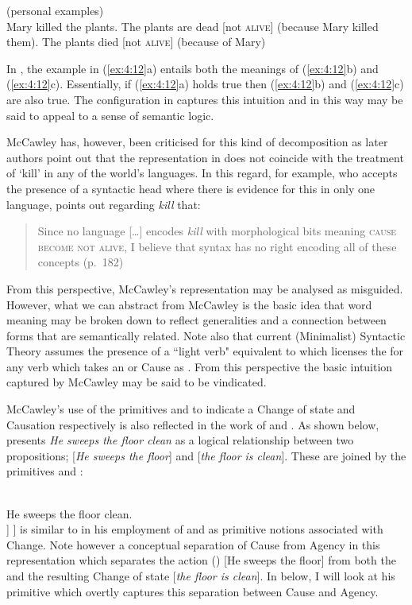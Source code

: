 \ea%
\label{ex:4:12}
(personal examples)\\
\ea Mary killed the plants.
\ex The plants are dead [not \textsc{alive}] (because Mary killed them).
\ex The plants died [\BECOME not \textsc{alive}] (because of Mary) 
\z \z

In , the example in (\ref{ex:4:12}a) entails both the meanings of (\ref{ex:4:12}b) and
(\ref{ex:4:12}c). Essentially, if (\ref{ex:4:12}a) holds true then (\ref{ex:4:12}b)
and (\ref{ex:4:12}c) are also true.  The configuration in
 captures this intuition and in this way may be said to
appeal to a sense of semantic logic.

McCawley has, however, been criticised for this kind of decomposition
as later authors point out that the representation in 
does not coincide with the treatment of ‘kill’ in any of the world’s
languages.  In this regard, \citet{Travis2000} for example, who
accepts the presence of a syntactic head where there is evidence for
this in only one language, points out regarding \textit{kill} that:

\begin{quote}
Since no language […] encodes \textit{kill} with morphological bits
meaning \textsc{cause become not alive}, I believe that syntax has no right
encoding all of these concepts (p.~182)
\end{quote}

From this perspective, McCawley’s representation may be analysed as
misguided.  However, what we can abstract from McCawley is the basic
idea that word meaning may be broken down to reflect generalities and
a connection between forms that are semantically related.  Note also
that current (Minimalist) Syntactic Theory assumes the presence of a
``light verb" equivalent to \CAUSE which licenses the 
for any verb which takes an  or Cause as .  From
this perspective the basic intuition captured by McCawley may be said
to be vindicated.

McCawley’s use of the primitives \BECOME and \CAUSE to indicate a Change
of state and Causation respectively is also reflected in the work of
\citet{Dowty1979} and \citet{Carter1976}.  As shown below,
\citet{Dowty1979} presents \textit{He sweeps the floor clean} as a
logical relationship between two propositions; [\textit{He sweeps the floor}]
and [\textit{the floor is clean}].  These are joined by the primitives
\CAUSE and \BECOME:

\ea%
\label{ex:4:13}
\citep[93]{Dowty1979}\\
He sweeps the floor clean.\\\relax
[ [He sweeps the floor] \CAUSE [ \BECOME [\textit{the floor is
  clean}] ] ]
\z
\citet{Dowty1979} is similar to \citet{McCawley1968} in his
employment of \CAUSE and \BECOME as primitive notions associated with
Change.  Note however a conceptual separation of Cause from Agency in
this representation which separates the action () [He sweeps
the floor] from both the \CAUSE and the resulting Change of state
[\textit{the floor is clean}].  In  below, I will
look at his \DO primitive which overtly captures this separation
between Cause and Agency.


